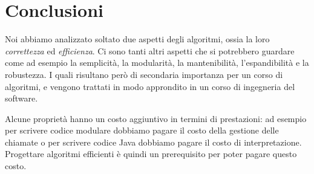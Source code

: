 \section*{Conclusioni}

Noi abbiamo analizzato soltato due aspetti degli algoritmi, ossia la loro \emph{correttezza} ed \emph{efficienza}.
Ci sono tanti altri aspetti che si potrebbero guardare come ad esempio la semplicità, la modularità, la mantenibilità, l'espandibilità e la robustezza.
I quali risultano però di secondaria importanza per un corso di algoritmi, e vengono trattati in modo approndito in un corso di ingegneria del software.

Alcune proprietà hanno un costo aggiuntivo in termini di prestazioni: ad esempio per scrivere codice modulare dobbiamo pagare il costo della gestione delle chiamate o per scrivere codice Java dobbiamo pagare il costo di interpretazione.
Progettare algoritmi efficienti è quindi un prerequisito per poter pagare questo costo.
\ifsubfile

\fi

